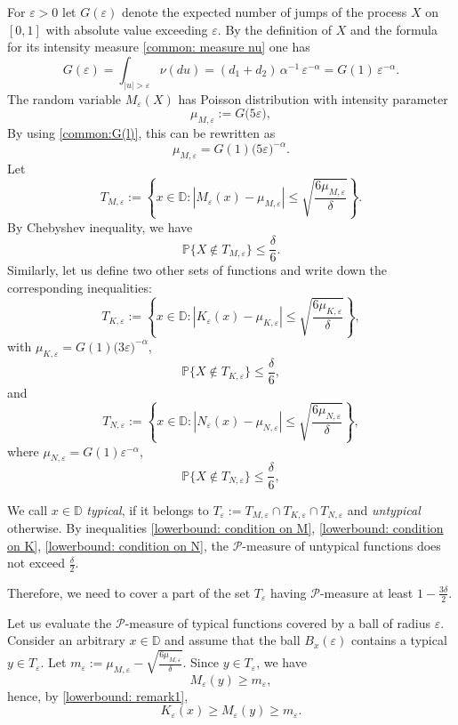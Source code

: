 \documentclass[12pt]{article}
\newcommand\D{\mathbb D}
\let\de\delta
\let\ep\varepsilon
\newcommand\PP{\mathcal P}
\newcommand{\prob}{\mathbb{P}}
\let\le\leqslant
\let\ge\geqslant
\theoremstyle{definition}
\newtheorem{notation}[theorem]{Notation}
\begin{document}
For $\ep > 0$  let $G(\ep)$ denote the expected number of jumps of the process $X$ on $[0,1]$
with absolute value exceeding $\ep$.
By the definition of $X$ and the formula for its intensity measure \eqref{common: measure nu} 
one has
\begin{equation}\label{common:G(l)}
       G(\ep) =    \int_{|u|> \ep}\nu(du )
       =(d_1+d_2)\, \alpha^{-1} \, \ep^{-\alpha} =G(1) \, \ep^{-\alpha}.
\end{equation}
The random variable $M_\ep(X)$ has Poisson distribution with intensity parameter
\[  
   \mu_{M,\ep} := G\big(5\ep\big),
\] 
By using \eqref{common:G(l)}, this can be rewritten as 
\[
   \mu_{M,\ep} = G(1)\big(5\ep\big)^{-\alpha}.
\]
Let
\[
     T_{M,\ep} := \left\{x\in \D: |M_\ep(x) - \mu_{M,\ep}| \le \sqrt{\frac{6\mu_{M,\ep}}{\delta}}\right\}.
\]
By Chebyshev inequality, we have 
\begin{equation}\label{lowerbound: condition on M}
    \prob\{X\not\in T_{M,\ep}\} \le \frac{\de}{6}.
\end{equation}
Similarly, let us define two other sets of functions and write down the corresponding inequalities:
\[
    T_{K,\ep} := \left\{x\in \D: |K_\ep(x) - \mu_{K,\ep}| \le \sqrt{\frac{6\mu_{K,\ep}}{\delta}}\right\},
\]
with $\mu_{K,\ep} = G(1)\big(3\ep\big)^{-\alpha}$,  
\begin{equation}\label{lowerbound: condition on K}
    \prob\{X\not\in T_{K,\ep}\} \le \frac{\de}{6},
\end{equation}
and
\[
   T_{N,\ep} := \left\{x\in \D: |N_\ep(x) - \mu_{N,\ep}| \le \sqrt{\frac{6\mu_{N,\ep}}{\delta}}\right\},
\]
where $\mu_{N,\ep} =G(1)\ep^{-\alpha}$, 
\begin{equation}\label{lowerbound: condition on N}
    \prob\{X\not\in T_{N,\ep}\} \le \frac{\de}{6},
\end{equation}


We call  $x\in\D$  \textit{typical}, if it belongs to 
$T_\ep:=T_{M,\ep}\cap T_{K,\ep}\cap T_{N,\ep}$ 
and  \textit{untypical} otherwise. 
By inequalities \eqref{lowerbound: condition on M}, \eqref{lowerbound: condition on K}, \eqref{lowerbound: condition on N}, the $\PP$-measure of untypical functions does not exceed $\frac{\de}{2}$. 

Therefore, we need to cover a part of the set $T_\ep$ having $\PP$-measure at least
$1 - \frac{3\de}{2}$.
 
Let us evaluate the $\PP$-measure of typical functions covered by a ball of radius $\ep$. 
Consider an arbitrary $x\in \D$ and assume that the ball $B_{x}(\ep)$ contains a typical $y\in T_\ep$. 
Let $m_\ep:= \mu_{M,\ep} - \sqrt{\frac{6\mu_{M,\ep}}{\delta}}$. 
Since $y \in T_\ep$, we have 
\[
    M_\ep(y) \ge m_\ep,
\]
hence, by \eqref{lowerbound: remark1},
\begin{equation}\label{lowerbound: inequality on K_ep}
    K_\ep(x) \ge M_\ep(y) \ge m_\ep.
\end{equation}
\end{document}
